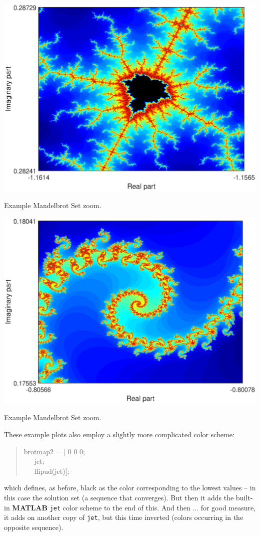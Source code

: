 \documentclass{tufte-book} %
\newenvironment{docspec}{\begin{quotation}\ttfamily\parskip0pt\parindent0pt\ignorespaces}{\end{quotation}}
\begin{document}
\begin{marginfigure}[-3.0in]
\includegraphics[width=\linewidth]{ch4-brot0b.eps}
\caption{Example Mandelbrot Set zoom.}
\label{fig:ch4-brot0b}
\end{marginfigure}

\begin{marginfigure}[-0.5in]
\includegraphics[width=\linewidth]{ch4-brot0c.eps}
\caption{Example Mandelbrot Set zoom.}
\label{fig:ch4-brot0c}
\end{marginfigure}

These example plots also employ a slightly more complicated color scheme:
\begin{docspec}
brotmap2 = [ 0 0 0;\\
\ \ \ jet;\\
\ \ \ flipud(jet)];
\end{docspec}
which defines, as before, black as the color corresponding to the lowest values -- in this case the solution set (a sequence that converges). But then it adds the built-in \textbf{MATLAB} \texttt{jet} color scheme to the end of this. And then ... for good measure, it adds on another copy of \texttt{jet}, but this time inverted (colors occurring in the opposite sequence).
\end{document}
